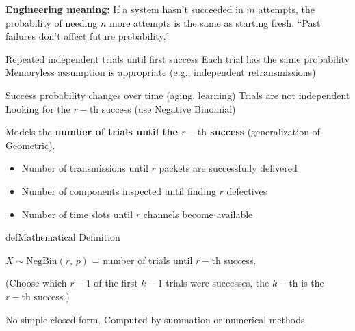 
\textbf{Engineering meaning:} If a system hasn’t succeeded in $m$ attempts, the probability of needing $n$ more attempts is the same as starting fresh. ``Past failures don’t affect future probability.''


\PSyes{} Repeated independent trials until first success\PSbr{}\PSyes{} Each trial has the same probability\PSbr{}\PSyes{} Memoryless assumption is appropriate (e.g., independent retransmissions)


\PSno{} Success probability changes over time (aging, learning)\PSbr{}\PSno{} Trials are not independent\PSbr{}\PSno{} Looking for the $r-\mathrm{th}$ success (use Negative Binomial)



Models the \textbf{number of trials until the $r-\mathrm{th}$ success} (generalization of Geometric).


\begin{itemize}
\tightlist
\item
  Number of transmissions until $r$ packets are successfully delivered
\item
  Number of components inspected until finding $r$ defectives
\item
  Number of time slots until $r$ channels become available
\end{itemize}

\begin{PSbox}[unbreakable]{def}{Mathematical Definition}

$X \sim \mathrm{NegBin}(r,\, p)$ = number of trials until $r-\mathrm{th}$ success.

\end{PSbox}



(Choose which $r-1$ of the first $k-1$ trials were successes, the $k-\mathrm{th}$ is the $r-\mathrm{th}$ success.)


No simple closed form. Computed by summation or numerical methods.

